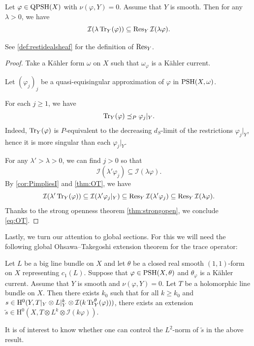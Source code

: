 \begin{proposition}\label{prop:OT2}
    Let $\varphi\in \mathrm{QPSH}(X)$ with $\nu(\varphi,Y)=0$. Assume that $Y$ is smooth.
    Then for any $\lambda>0$, we have
    \begin{equation}\label{eq:OT}
        \mathcal{I}(\lambda \operatorname{Tr}_Y(\varphi))\subseteq \operatorname{Res}_Y\mathcal{I}(\lambda \varphi).
    \end{equation}
\end{proposition}
See \cref{def:restidealsheaf} for the definition of $\operatorname{Res}_Y$.

\begin{proof}
Take a Kähler form $\omega$ on $X$ such that $\omega_{\varphi}$ is a Kähler current.

Let $(\varphi_j)_j$ be a quasi-equisingular approximation of $\varphi$ in $\mathrm{PSH}(X,\omega)$.

For each $j\geq 1$, we have
\[
\operatorname{Tr}_Y(\varphi) \preceq_P \varphi_j|_Y.
\]
Indeed, $\operatorname{Tr}_Y(\varphi)$ is $P$-equivalent to the decreasing $d_S$-limit of
the restrictions $\varphi_j|_Y$, hence it is more singular than each
$\varphi_j|_Y$.

For any $\lambda'>\lambda>0$, we can find $j>0$ so that
\[
    \mathcal{I}(\lambda' \varphi_j)\subseteq \mathcal{I}(\lambda \varphi).
\]
By \cref{cor:PimpliesI} and \cref{thm:OT}, we have
\[
    \mathcal{I}(\lambda' \operatorname{Tr}_Y(\varphi))\subseteq \mathcal{I}(\lambda' \varphi_j|_Y)\subseteq \operatorname{Res}_Y\mathcal{I}(\lambda'\varphi_j)\subseteq \operatorname{Res}_Y\mathcal{I}(\lambda \varphi).
\]
Thanks to the strong openness theorem \cref{thm:strongopen}, we conclude \eqref{eq:OT}.
\end{proof}


Lastly, we turn our attention to global sections. For this we will need the following global Ohsawa--Takegoshi extension theorem for the trace operator:

\begin{theorem}\label{thm:OT_ext_global}
    Let $L$ be a big line bundle on $X$ and let $\theta$ be a closed real smooth $(1,1)$-form on $X$ representing $c_1(L)$.
Suppose that $\varphi\in \mathrm{PSH}(X,\theta)$ and $\theta_{\varphi}$ is a Kähler current. Assume that $Y$ is smooth and $\nu(\varphi,Y)=0$.
Let $T$ be a holomorphic line bundle on $X$.
Then there exists $k_0$ such that for all $k \geq k_0$ and $s \in \mathrm{H}^0(Y, T|_Y\otimes L|_Y^k\otimes \mathcal{I}(k \operatorname{Tr}_Y^{\theta}(\varphi)))$, there exists an extension $\tilde s \in \mathrm{H}^0(X, T\otimes L^k \otimes \mathcal{I}(k\varphi))$.
\end{theorem}
It is of interest to know whether one can control the $L^2$-norm of $\tilde{s}$ in the above result.

